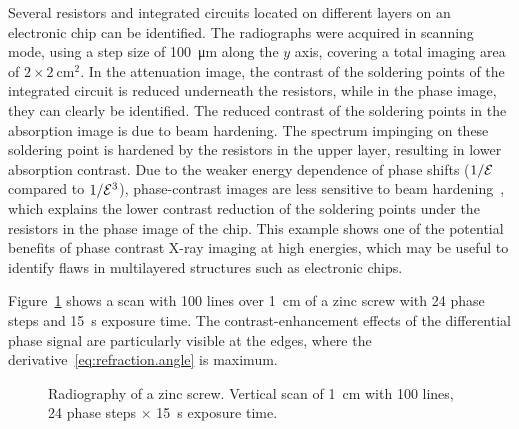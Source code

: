Several resistors and integrated circuits located on different
layers on an electronic chip can be identified. The radiographs were acquired in scanning
mode, using a step size of \SI{100}{\micro\metre} along the $y$ axis, covering a total imaging
area of $2 \times \SI{2}{\centi\metre^2}$. In the attenuation image, the contrast of the soldering
points of the integrated circuit is reduced underneath the resistors, while
in the phase image, they can clearly be identified. The reduced contrast of
the soldering points in the absorption image is due to beam hardening. The
spectrum impinging on these soldering point is hardened by the resistors in
the upper layer, resulting in lower absorption contrast. Due to the weaker
energy dependence of phase shifts ($1/\mathcal{E}$ compared to $1/\mathcal{E}^3$), phase-contrast
images are less sensitive to beam hardening~\parencite{Chabior2011a}, which explains the lower
contrast reduction of the soldering points under the resistors in the
phase image of the chip. This example shows one of the potential benefits of
phase contrast X-ray imaging at high energies, which may be useful to
identify flaws in multilayered structures such as electronic chips.

Figure~\ref{fig:screw} shows a scan with \num{100} lines over
\SI{1}{\centi\metre} of a zinc screw
with \num{24} phase steps and \SI{15}{\second} exposure time.
The contrast-enhancement effects of the differential phase signal are
particularly visible at the edges, where the
derivative~\eqref{eq:refraction.angle} is maximum.

\begin{figure}[hbt]
    \centering
    
    \caption[Radiography of a zinc screw.]{Radiography of a zinc screw.
        Vertical scan of \SI{1}{\centi\metre} with \num{100} lines,
        \num{24} phase steps $\times$ \SI{15}{\second} exposure time.}
    \label{fig:screw}
\end{figure}

